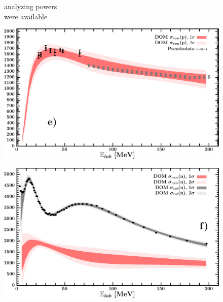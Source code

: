 \documentclass[twocolumn,secnumarabic,amssymb, nobibnotes, aps, prl,
superscriptaddress, nobalancelastpage, draft]{revtex4}
\begin{document}
\begin{figure}[!htb]
\begin{minipage}{0.4\linewidth}
\begin{minipage}{0.45\linewidth}
            analyzing powers \\
            were available
        \end{minipage}
        \label{DOM_sn124_neutron_elastic}
    \end{minipage}
    \begin{minipage}{0.4\linewidth}
        \centering
        \includegraphics[width=\linewidth]{figures/sn124_protonInelastic.png}
        \label{DOM_sn124_proton_inelastic}
    \end{minipage}\hspace{6pt}
    \begin{minipage}{0.4\linewidth}
        \centering
        \includegraphics[width=\linewidth]{figures/sn124_neutronInelastic.png}
        \label{DOM_sn124_neutron_inelastic}
    \end{minipage}
    \centering
    \begin{minipage}{0.4\linewidth}
        \centering

\end{minipage}
\end{figure}
\end{document}
